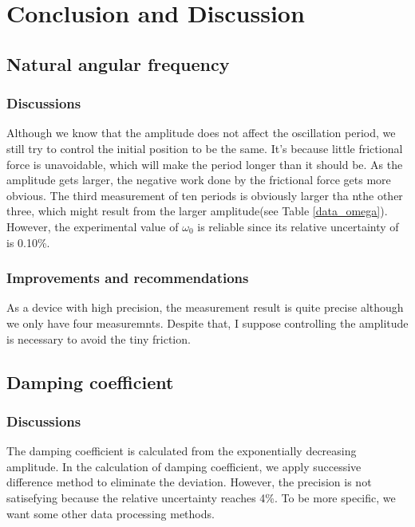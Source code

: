 \section{Conclusion and Discussion}

\subsection{Natural angular frequency}

\subsubsection{Discussions}

Although we know that the amplitude does not affect the oscillation period, we
still try to control the initial position to be the same. It's because little
frictional force is unavoidable, which will make the period longer than it
should be. As the amplitude gets larger, the negative work done by the
frictional force gets more obvious. The third measurement of ten periods is
obviously larger tha nthe other three, which might result from the larger
amplitude(see Table \ref{data_omega}). However, the experimental value of
$\omega_0$ is reliable since its relative uncertainty of is 0.10\%. 

\subsubsection{Improvements and recommendations}

As a device with high precision, the measurement result is quite precise
although we only have four measuremnts. Despite that, I suppose controlling the
amplitude is necessary to avoid the tiny friction. 

\subsection{Damping coefficient}

\subsubsection{Discussions}

The damping coefficient is calculated from the exponentially decreasing
amplitude. In the calculation of damping coefficient, we apply successive
difference method to eliminate the deviation. However, the precision is not
satisefying because the relative uncertainty reaches 4\%. To be more specific,
we want some other data processing methods. 

